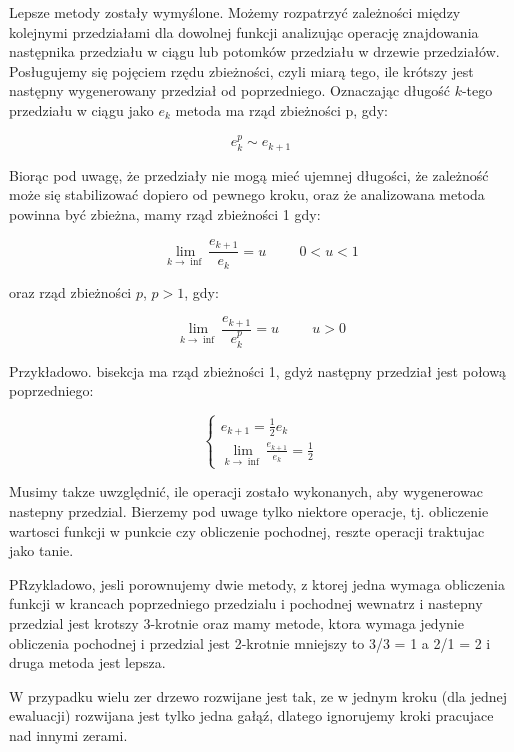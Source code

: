 \documentclass[11pt,a4paper,oneside]{report}
\begin{document}
Lepsze metody zostały wymyślone. Możemy rozpatrzyć zależności między kolejnymi przedziałami dla dowolnej funkcji analizując operację znajdowania następnika przedziału w ciągu lub potomków przedziału w drzewie przedziałów. Posługujemy się pojęciem rzędu zbieżności, czyli miarą tego, ile krótszy jest następny wygenerowany przedział od poprzedniego. Oznaczając długość $k$-tego przedziału w ciągu jako $e_k$ metoda ma rząd zbieżności p, gdy:

$$e_k^p \sim e_{k+1}$$

Biorąc pod uwagę, że przedziały nie mogą mieć ujemnej długości, że zależność może się stabilizować dopiero od pewnego kroku, oraz że analizowana metoda powinna być zbieżna, mamy rząd zbieżności 1 gdy:

$$\lim_{k \rightarrow \inf}\frac{e_{k+1}}{e_k} = u\hspace{1cm}0<u<1$$

oraz rząd zbieżności $p$, $p>1$, gdy:

$$\lim_{k\rightarrow\inf}\frac{e_{k+1}}{e_k^p} = u\hspace{1cm}u>0$$

Przykładowo. bisekcja ma rząd zbieżności 1, gdyż następny przedział jest połową poprzedniego:

\begin{equation}
\begin{cases}
e_{k+1}=\frac{1}{2}e_k \\
\lim_{k \rightarrow \inf}\frac{e_{k+1}}{e_k}=\frac{1}{2}
\end{cases}
\end{equation}

Musimy takze uwzględnić, ile operacji zostało wykonanych, aby wygenerowac nastepny przedzial. Bierzemy pod uwage tylko niektore operacje, tj. obliczenie wartosci funkcji w punkcie czy obliczenie pochodnej, reszte operacji traktujac jako tanie.

PRzykladowo, jesli porownujemy dwie metody, z ktorej jedna wymaga obliczenia funkcji w krancach poprzedniego przedzialu i pochodnej wewnatrz i nastepny przedzial jest krotszy 3-krotnie oraz mamy metode, ktora wymaga jedynie obliczenia pochodnej i przedzial jest 2-krotnie mniejszy to 3/3 = 1 a 2/1 = 2 i druga metoda jest lepsza.

W przypadku wielu zer drzewo rozwijane jest tak, ze w jednym kroku (dla jednej ewaluacji) rozwijana jest tylko jedna gałąź, dlatego ignorujemy kroki pracujace nad innymi zerami.
\end{document}
